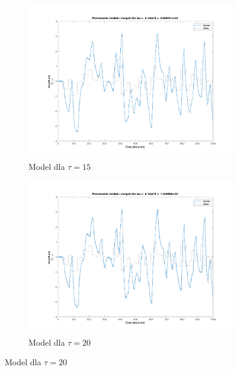 \documentclass[a4paper, 11pt]{article}
\begin{document}
\begin{enumerate}
\begin{figure}
\begin{subfigure}[b]{0.475\textwidth}
			\centering
			\includegraphics[width=\linewidth]{./ModelsP1/modelTau5.png}
			\caption[Model dla \(\tau =15\) ]
			{Model dla \(\tau = 15\)}
		\end{subfigure}
        \quad
        \begin{subfigure}[b]{0.475\textwidth}
			\centering
			\includegraphics[width=\linewidth]{./ModelsP1/modelTau8.png}
			\caption[Model dla \(\tau = 20\) ]
			{Model dla \(\tau = 20\)}
		\end{subfigure}

\end{figure}


\end{enumerate}
\end{document}
